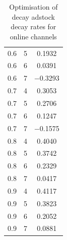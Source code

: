 \documentclass[11pt, a4paper]{article}
\begin{document}
\begin{table}[h!]
\begin{tabular}{l l S[table-format=-1.4]}
        0.6 & 5 & \num{0.1932} \\
        0.6 & 6 & \num{0.0391} \\
        0.6 & 7 & \num{-0.3293} \\
        0.7 & 4 & \num{0.3053} \\
        0.7 & 5 & \num{0.2706} \\
        0.7 & 6 & \num{0.1247} \\
        0.7 & 7 & \num{-0.1575} \\
        0.8 & 4 & \num{0.4040} \\
        0.8 & 5 & \num{0.3742} \\
        0.8 & 6 & \num{0.2329} \\
        0.8 & 7 & \num{0.0417} \\
        0.9 & 4 & \num{0.4117} \\
        0.9 & 5 & \num{0.3823} \\
        0.9 & 6 & \num{0.2052} \\
        0.9 & 7 & \num{0.0881} \\
        \bottomrule
    \end{tabular}
    \caption{Optimisation of decay adstock decay rates for online channels}
    \label{tab:adstock_decay_online}
\end{table}
\end{document}
